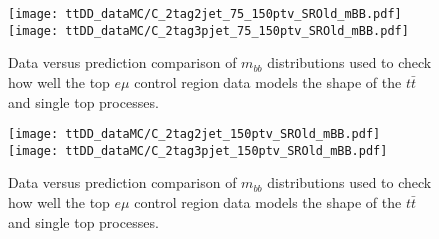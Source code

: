 \begin{figure}[h]
	\centering
  \texttt{[image: ttDD\_dataMC/C\_2tag2jet\_75\_150ptv\_SROld\_mBB.pdf]}\\
  \texttt{[image: ttDD\_dataMC/C\_2tag3pjet\_75\_150ptv\_SROld\_mBB.pdf]}\\
	\caption{Data versus prediction comparison of $m_{bb}$ distributions used to
    check how well the top $e\mu$ control region data models the shape of the
    $t\bar{t}$ and single top processes.}
	\label{fig:ttbardd-mbb}
\end{figure}
\begin{figure}[h]\ContinuedFloat
	\centering
  \texttt{[image: ttDD\_dataMC/C\_2tag2jet\_150ptv\_SROld\_mBB.pdf]}\\
  \texttt{[image: ttDD\_dataMC/C\_2tag3pjet\_150ptv\_SROld\_mBB.pdf]}
	\caption{Data versus prediction comparison of $m_{bb}$ distributions used to
    check how well the top $e\mu$ control region data models the shape of the
    $t\bar{t}$ and single top processes.}
	\label{fig:ttbardd-mbb}
\end{figure}